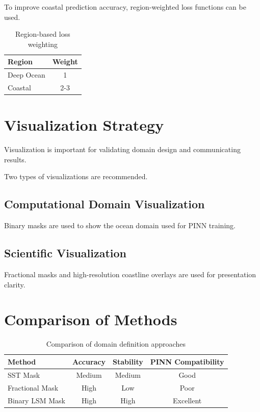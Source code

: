 \documentclass[12pt,a4paper]{article}
\begin{document}
To improve coastal prediction accuracy, region-weighted loss functions can be used.

\begin{table}[H]
\centering
\begin{tabular}{lc}
\toprule
Region & Weight \\
\midrule
Deep Ocean & 1 \\
Coastal & 2-3 \\
\bottomrule
\end{tabular}
\caption{Region-based loss weighting}
\end{table}

\section{Visualization Strategy}

Visualization is important for validating domain design and communicating results.

Two types of visualizations are recommended.

\subsection{Computational Domain Visualization}

Binary masks are used to show the ocean domain used for PINN training.

\subsection{Scientific Visualization}

Fractional masks and high-resolution coastline overlays are used for presentation clarity.

\section{Comparison of Methods}

\begin{table}[H]
\centering
\begin{tabular}{lccc}
\toprule
Method & Accuracy & Stability & PINN Compatibility \\
\midrule
SST Mask & Medium & Medium & Good \\
Fractional Mask & High & Low & Poor \\
Binary LSM Mask & High & High & Excellent \\
\bottomrule
\end{tabular}
\caption{Comparison of domain definition approaches}
\end{table}
\end{document}
